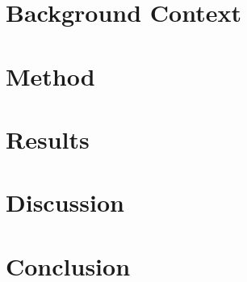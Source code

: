 \documentclass[a4paper]{article}
\begin{document}
\nocite{*} %

\section{Background Context}

\section{Method}

\section{Results}

\section{Discussion}

\section{Conclusion}


\medskip
\printbibliography
\end{document}
